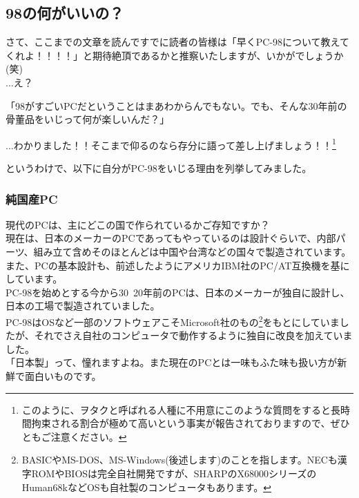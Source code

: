 \documentclass[b5paper,9pt,platex,dvipdfmx]{jsarticle}
\begin{document}
\begin{multicols*}{3}
\part{98の何がいいの？}
\setcounter{section}{0}
さて、ここまでの文章を読んですでに読者の皆様は「早くPC-98について教えてくれよ！！！！」と期待絶頂であるかと推察いたしますが、いかがでしょうか(笑)\\

...え？

\begin{screen}
「98がすごいPCだということはまあわからんでもない。でも、そんな30年前の骨董品をいじって何が楽しいんだ？」
\end{screen}

...わかりました！！そこまで仰るのなら存分に語って差し上げましょう！！\footnote{このように、ヲタクと呼ばれる人種に不用意にこのような質問をすると長時間拘束される割合が極めて高いという事実が報告されておりますので、ぜひともご注意ください。}

というわけで、以下に自分がPC-98をいじる理由を列挙してみました。\\
\section[short]{純国産PC}
現代のPCは、主にどこの国で作られているかご存知ですか？\\
現在は、日本のメーカーのPCであってもやっているのは設計ぐらいで、内部パーツ、組み立て含めそのほとんどは中国や台湾などの国々で製造されています。\\
また、PCの基本設計も、前述したようにアメリカIBM社のPC/AT互換機を基にしています。\\
PC-98を始めとする今から30~20年前のPCは、日本のメーカーが独自に設計し、日本の工場で製造されていました。\\
PC-98はOSなど一部のソフトウェアこそMicrosoft社のもの\footnote{BASICやMS-DOS、MS-Windows(後述します)のことを指します。NECも漢字ROMやBIOSは完全自社開発ですが、SHARPのX68000シリーズのHuman68kなどOSも自社製のコンピュータもあります。}をもとにしていましたが、それでさえ自社のコンピュータで動作するように独自に改良を加えていました。\\
「日本製」って、憧れますよね。また現在のPCとは一味もふた味も扱い方が新鮮で面白いものです。\\

\end{multicols*}
\end{document}
